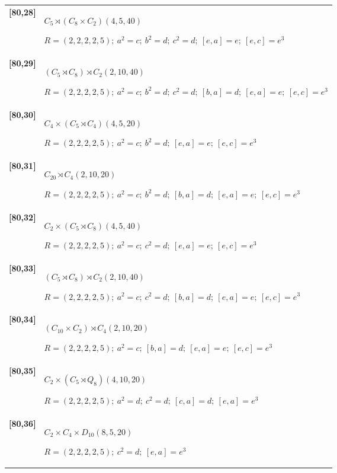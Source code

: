 \documentclass[UTF8,fontset=fandol,11pt,a4paper]{ctexart}
\begin{document}
\begin{longtable}{@{}p{17mm}>{\raggedright\arraybackslash}p{141mm}@{}}
\textbf{[80,28]} & $C_{5}\rtimes (C_{8}\times C_{2})$\quad $(4,5,40)$\par\(R=(2,2,2,2,5);\allowbreak\ a^{2}=c;\allowbreak\ b^{2}=d;\allowbreak\ c^{2}=d;\allowbreak\ [e,a]=e;\allowbreak\ [e,c]=e^{3}\)\\[3pt]

\textbf{[80,29]} & $(C_{5}\rtimes C_{8})\rtimes C_{2}$\quad $(2,10,40)$\par\(R=(2,2,2,2,5);\allowbreak\ a^{2}=c;\allowbreak\ b^{2}=d;\allowbreak\ c^{2}=d;\allowbreak\ [b,a]=d;\allowbreak\ [e,a]=e;\allowbreak\ [e,c]=e^{3}\)\\[3pt]

\textbf{[80,30]} & $C_{4}\times (C_{5}\rtimes C_{4})$\quad $(4,5,20)$\par\(R=(2,2,2,2,5);\allowbreak\ a^{2}=c;\allowbreak\ b^{2}=d;\allowbreak\ [e,a]=e;\allowbreak\ [e,c]=e^{3}\)\\[3pt]

\textbf{[80,31]} & $C_{20}\rtimes C_{4}$\quad $(2,10,20)$\par\(R=(2,2,2,2,5);\allowbreak\ a^{2}=c;\allowbreak\ b^{2}=d;\allowbreak\ [b,a]=d;\allowbreak\ [e,a]=e;\allowbreak\ [e,c]=e^{3}\)\\[3pt]

\textbf{[80,32]} & $C_{2}\times (C_{5}\rtimes C_{8})$\quad $(4,5,40)$\par\(R=(2,2,2,2,5);\allowbreak\ a^{2}=c;\allowbreak\ c^{2}=d;\allowbreak\ [e,a]=e;\allowbreak\ [e,c]=e^{3}\)\\[3pt]

\textbf{[80,33]} & $(C_{5}\rtimes C_{8})\rtimes C_{2}$\quad $(2,10,40)$\par\(R=(2,2,2,2,5);\allowbreak\ a^{2}=c;\allowbreak\ c^{2}=d;\allowbreak\ [b,a]=d;\allowbreak\ [e,a]=e;\allowbreak\ [e,c]=e^{3}\)\\[3pt]

\textbf{[80,34]} & $(C_{10}\times C_{2})\rtimes C_{4}$\quad $(2,10,20)$\par\(R=(2,2,2,2,5);\allowbreak\ a^{2}=c;\allowbreak\ [b,a]=d;\allowbreak\ [e,a]=e;\allowbreak\ [e,c]=e^{3}\)\\[3pt]

\textbf{[80,35]} & $C_{2}\times (C_{5}\rtimes Q_{8})$\quad $(4,10,20)$\par\(R=(2,2,2,2,5);\allowbreak\ a^{2}=d;\allowbreak\ c^{2}=d;\allowbreak\ [c,a]=d;\allowbreak\ [e,a]=e^{3}\)\\[3pt]

\textbf{[80,36]} & $C_{2}\times C_{4}\times D_{10}$\quad $(8,5,20)$\par\(R=(2,2,2,2,5);\allowbreak\ c^{2}=d;\allowbreak\ [e,a]=e^{3}\)\\[3pt]


\end{longtable}
\end{document}
